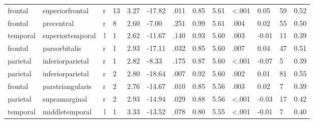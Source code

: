 \documentclass{article}
\begin{document}
\begin{longtable}{llrR{1.3cm}R{1cm}R{1.3cm}R{1cm}R{1cm}R{1.3cm}R{1cm}R{1.8cm}R{1.3cm}R{1.8cm}}
   frontal &           superiorfrontal &    r &        13 &                  3.27 &           -17.82 &               .011 &                               0.85 &                          5.61 &                   \textless.001 &   0.05 &     59 &      0.52 \\
   frontal &                precentral &    r &         8 &                  2.60 &            -7.00 &               .251 &                               0.99 &                          5.61 &                            .004 &   0.02 &     55 &      0.50 \\
  temporal &          superiortemporal &    l &         1 &                  2.62 &           -11.67 &               .140 &                               0.93 &                          5.60 &                            .003 &  -0.01 &     11 &      0.39 \\
   frontal &             parsorbitalis &    r &         1 &                  2.93 &           -17.11 &               .032 &                               0.85 &                          5.60 &                            .007 &   0.04 &     47 &      0.51 \\
  parietal &          inferiorparietal &    r &         1 &                  2.82 &            -8.33 &               .175 &                               0.87 &                          5.60 &                   \textless.001 &  -0.07 &      5 &      0.39 \\
  parietal &          inferiorparietal &    r &         2 &                  2.80 &           -18.64 &               .007 &                               0.92 &                          5.60 &                            .002 &   0.01 &     81 &      0.55 \\
   frontal &          parstriangularis &    r &         2 &                  2.76 &           -14.67 &               .010 &                               0.85 &                          5.56 &                            .003 &   0.02 &      7 &      0.39 \\
  parietal &             supramarginal &    r &         2 &                  2.93 &           -14.94 &               .029 &                               0.88 &                          5.56 &                   \textless.001 &  -0.03 &     17 &      0.42 \\
  temporal &            middletemporal &    l &         1 &                  3.33 &           -13.52 &               .078 &                               0.80 &                          5.55 &                   \textless.001 &  -0.01 &      7 &      0.40 \\

\end{longtable}
\end{document}
